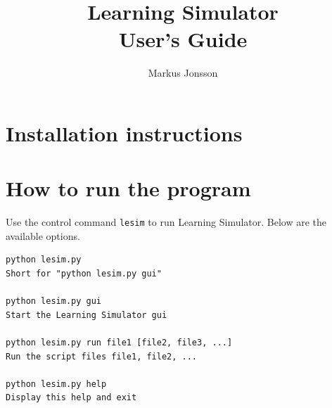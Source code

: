 \documentclass[11pt]{article}
\title{Learning Simulator \\ User's Guide}
\author{Markus Jonsson}
\begin{document}
\maketitle

\section{Installation instructions}

\section{How to run the program}
Use the control command \verb|lesim| to run Learning Simulator. Below are the available options.

\begin{lstlisting}[caption={\texttt{lesim} syntax}]
python lesim.py
Short for "python lesim.py gui"
    
python lesim.py gui
Start the Learning Simulator gui
    
python lesim.py run file1 [file2, file3, ...]
Run the script files file1, file2, ...
    
python lesim.py help
Display this help and exit
\end{lstlisting}
\end{document}
